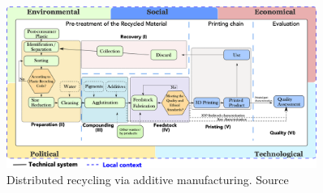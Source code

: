 \documentclass[
  11pt,
  a4paperpaper,
  onecolumn]{article}
\begin{document}
\begin{figure}

{\centering \includegraphics[width=0.9\textwidth,height=\textheight]{Figures/SDRAM-00.png}

}

\caption{\label{fig-DRAM}Distributed recycling via additive
manufacturing. Source}

\end{figure}
\end{document}

